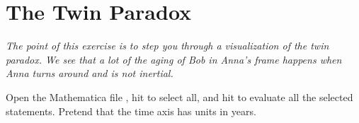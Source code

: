 \section{The Twin Paradox}

\makelabheader %

\bigskip

\textit{The point of this exercise is to step you through a visualization of the twin paradox.  We see that a lot of the aging of Bob in Anna's frame happens when Anna turns around and is not inertial.}

Open the Mathematica file , hit  to select all, and hit  to evaluate all the selected statements.  Pretend that the time axis has units in years.

